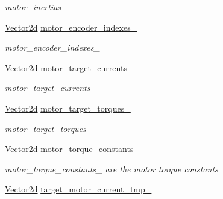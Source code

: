 \begin{DoxyCompactItemize}
\begin{DoxyCompactList}\small\item\em motor\+\_\+inertias\+\_\+ \end{DoxyCompactList}\item 
\hyperlink{common__header_8hpp_acb6916bc8c9fe9d98c484fd4cc201447}{Vector2d} \hyperlink{classblmc__robots_1_1Stuggihop_a89d7bfb8de6cb40c9b14cb0338442b70}{motor\+\_\+encoder\+\_\+indexes\+\_\+}\hypertarget{classblmc__robots_1_1Stuggihop_a89d7bfb8de6cb40c9b14cb0338442b70}{}\label{classblmc__robots_1_1Stuggihop_a89d7bfb8de6cb40c9b14cb0338442b70}

\begin{DoxyCompactList}\small\item\em motor\+\_\+encoder\+\_\+indexes\+\_\+ \end{DoxyCompactList}\item 
\hyperlink{common__header_8hpp_acb6916bc8c9fe9d98c484fd4cc201447}{Vector2d} \hyperlink{classblmc__robots_1_1Stuggihop_a531b6300fe90ee588f24db47c01aa90d}{motor\+\_\+target\+\_\+currents\+\_\+}\hypertarget{classblmc__robots_1_1Stuggihop_a531b6300fe90ee588f24db47c01aa90d}{}\label{classblmc__robots_1_1Stuggihop_a531b6300fe90ee588f24db47c01aa90d}

\begin{DoxyCompactList}\small\item\em motor\+\_\+target\+\_\+currents\+\_\+ \end{DoxyCompactList}\item 
\hyperlink{common__header_8hpp_acb6916bc8c9fe9d98c484fd4cc201447}{Vector2d} \hyperlink{classblmc__robots_1_1Stuggihop_ad26d6b054a984fb1eb01c62a3777827d}{motor\+\_\+target\+\_\+torques\+\_\+}\hypertarget{classblmc__robots_1_1Stuggihop_ad26d6b054a984fb1eb01c62a3777827d}{}\label{classblmc__robots_1_1Stuggihop_ad26d6b054a984fb1eb01c62a3777827d}

\begin{DoxyCompactList}\small\item\em motor\+\_\+target\+\_\+torques\+\_\+ \end{DoxyCompactList}\item 
\hyperlink{common__header_8hpp_acb6916bc8c9fe9d98c484fd4cc201447}{Vector2d} \hyperlink{classblmc__robots_1_1Stuggihop_aed1ca67af3da9ea0bafad293f72522de}{motor\+\_\+torque\+\_\+constants\+\_\+}\hypertarget{classblmc__robots_1_1Stuggihop_aed1ca67af3da9ea0bafad293f72522de}{}\label{classblmc__robots_1_1Stuggihop_aed1ca67af3da9ea0bafad293f72522de}

\begin{DoxyCompactList}\small\item\em motor\+\_\+torque\+\_\+constants\+\_\+ are the motor torque constants \end{DoxyCompactList}\item 
\hyperlink{common__header_8hpp_acb6916bc8c9fe9d98c484fd4cc201447}{Vector2d} \hyperlink{classblmc__robots_1_1Stuggihop_a1ed246c189c92bc9fb87996fabe9dee8}{target\+\_\+motor\+\_\+current\+\_\+tmp\+\_\+}\hypertarget{classblmc__robots_1_1Stuggihop_a1ed246c189c92bc9fb87996fabe9dee8}{}\label{classblmc__robots_1_1Stuggihop_a1ed246c189c92bc9fb87996fabe9dee8}


\end{DoxyCompactItemize}
